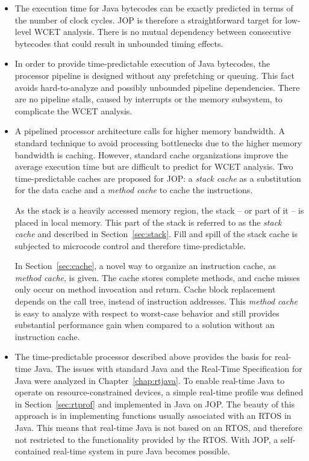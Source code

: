 \begin{itemize}

        \item
The execution time for Java bytecodes can be exactly predicted in
terms of the number of clock cycles.
JOP is therefore a straightforward target for low-level WCET
analysis. There is no mutual dependency between consecutive
bytecodes that could result in unbounded timing effects.

    \item
In order to provide time-predictable execution of Java bytecodes,
the processor pipeline is designed without any prefetching or
queuing. This fact avoids hard-to-analyze and possibly unbounded
pipeline dependencies. There are no pipeline stalls, caused by
interrupts or the memory subsystem, to complicate the WCET analysis.

    \item
A pipelined processor architecture calls for higher memory
bandwidth. A standard technique to avoid processing bottlenecks due
to the higher memory bandwidth is caching.
However, standard cache organizations improve the average execution
time but are difficult to predict for WCET analysis. Two
time-predictable caches are proposed for JOP: a \emph{stack cache}
as a substitution for the data cache and a \emph{method cache} to
cache the instructions.

As the stack is a heavily accessed memory region, the stack -- or
part of it -- is placed in local memory. This part of the stack is
referred to as the \emph{stack cache} and described in
Section~\ref{sec:stack}. Fill and spill of the stack cache is
subjected to microcode control and therefore time-predictable.

In Section~\ref{sec:cache}, a novel way to organize an
instruction cache, as \emph{method cache}, is given. The cache
stores complete methods, and cache misses only occur on method
invocation and return. Cache block replacement depends on the
call tree, instead of instruction addresses. This \emph{method
cache} is easy to analyze with respect to worst-case behavior and
still provides substantial performance gain when compared to a
solution without an instruction cache.

    \item The time-predictable processor described above provides
        the basis for real-time Java. The issues with standard
        Java and the Real-Time Specification for Java were
        analyzed in Chapter~\ref{chap:rtjava}. To enable
        real-time Java to operate on resource-constrained
        devices, a simple real-time profile was defined in
        Section~\ref{sec:rtprof} and implemented in Java on JOP.
        The beauty of this approach is in implementing functions
        usually associated with an RTOS in Java. This means that
        real-time Java is not based on an RTOS, and therefore not
        restricted to the functionality provided by the RTOS.
        With JOP, a self-contained real-time system in pure Java
        becomes possible.


\end{itemize}
